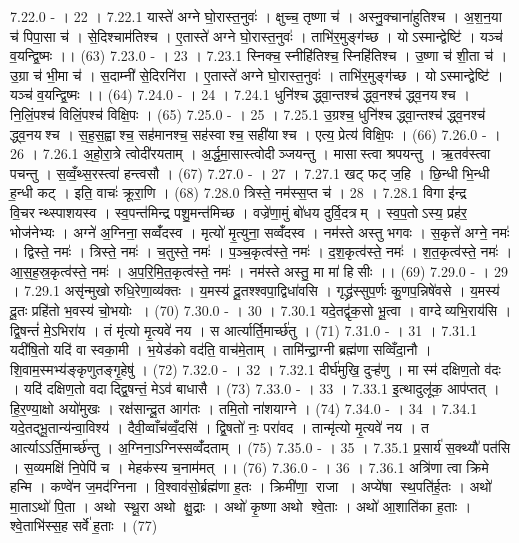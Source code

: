 7.22.0
- । 22 ।
7.22.1
यास्ते॑ अग्ने घो॒रास्त॒नुवः॑ । क्षुच्च॒ तृष्णा च॑ । अस्नु॒क्चाना॑हुतिश्च । अ॒श॒न॒या च॑ पिपा॒सा च॑ । से॒दिश्चाम॑तिश्च । ए॒तास्ते॑ अग्ने घो॒रास्त॒नुवः॑ । ताभि॑र॒मुङ्ग॑च्छ । योऽस्मान्द्वेष्टि॑ । यञ्च॑ व॒यन्द्वि॒ष्मः ।। (63)
7.23.0
- । 23 ।
7.23.1
स्निक्च॒ स्नीहि॑तिश्च॒ स्निहि॑तिश्च । उ॒ष्णा च॑ शी॒ता च॑ । उ॒ग्रा च॑ भी॒मा च॑ । स॒दाम्नी॑ से॒दिरनि॑रा । ए॒तास्ते॑ अग्ने घो॒रास्त॒नुवः॑ । ताभि॑र॒मुङ्ग॑च्छ । योऽस्मान्द्वेष्टि॑ । यञ्च॑ व॒यन्द्वि॒ष्मः ।। (64)
7.24.0
- । 24 ।
7.24.1
धुनि॑श्च द्ध्वा॒न्तश्च॑ द्ध्व॒नश्च॑ द्ध्व॒नय॑श्च । नि॒लिं॒पश्च॑ विलिं॒पश्च॑ विक्षि॒पः । (65)
7.25.0
- । 25 ।
7.25.1
उ॒ग्रश्च॒ धुनि॑श्च द्ध्वा॒न्तश्च॑ द्ध्व॒नश्च॑ द्ध्व॒नय॑श्च । स॒ह॒स॒ह्वाश्च॒ सह॑मानश्च॒ सह॑स्वाश्च॒ सही॑याश्च । एत्य॒ प्रेत्य॑ विक्षि॒पः । (66)
7.26.0
- । 26 ।
7.26.1
अ॒हो॒रा॒त्रे त्वोदी॑रयताम् । अ॒र्द्ध॒मा॒सास्त्वोदीञ्जयन्तु । मासास्त्वा श्रपयन्तु । ऋ॒तव॑स्त्वा पचन्तु । स॒व्वँ॒थ्स॒रस्त्वा॑ हन्त्वसौ । (67)
7.27.0
- । 27 ।
7.27.1
खट् फट् ज॒हि । छि॒न्धी भि॒न्धी ह॒न्धी कट् । इति॒ वाचः॑ क्रूरा॒णि । (68)
7.28.0
त्रिस्ते॒ नम॑स्स॒प्त च॑ । 28 ।
7.28.1
विगा इ॑न्द्र वि॒चरन्थ्स्पाशयस्व । स्व॒पन्त॑मिन्द्र पशु॒मन्त॑मिच्छ । वज्रे॑णा॒मुं बो॑धय दुर्वि॒दत्रम् । स्व॒प॒तोऽस्य॒ प्रह॑र॒ भोज॑नेभ्यः । अग्ने॑ अ॒ग्निना॒ सव्वँ॑दस्व । मृत्यो॑ मृ॒त्युना॒ सव्वँ॑दस्व । नम॑स्ते अस्तु भगवः । स॒कृत्ते॑ अग्ने॒ नमः॑ । द्विस्ते॒ नमः॑ । त्रिस्ते॒ नमः॑ । च॒तुस्ते॒ नमः॑ । प॒ञ्च॒कृत्व॑स्ते॒ नमः॑ । द॒श॒कृत्व॑स्ते॒ नमः॑ । श॒त॒कृत्व॑स्ते॒ नमः॑ । आ॒स॒ह॒स्र॒कृत्व॑स्ते॒ नमः॑ । अ॒प॒रि॒मि॒त॒कृत्व॑स्ते॒ नमः॑ । नम॑स्ते अस्तु॒ मा मा॑ हिसीः ।। (69)
7.29.0
- । 29 ।
7.29.1
असृ॑न्मुखो रुधि॒रेणा॒व्य॑क्तः । य॒मस्य॑ दू॒तश्श्वपा॒द्विधा॑वसि । गृद्ध्र॑स्सुप॒र्णः कु॒णप॒न्निषे॑वसे । य॒मस्य॑ दू॒तः प्रहि॑तो भ॒वस्य॑ चो॒भयोः । (70)
7.30.0
- । 30 ।
7.30.1
यदे॒तद्वृ॑क॒सो भू॒त्वा । वाग्देव्यभि॒राय॑सि । द्वि॒षन्तं॑ मे॒ऽभिरा॑य । तं मृ॑त्यो मृ॒त्यवे॑ नय । स आर्त्यार्ति॒मार्च्छ॑तु । (71)
7.31.0
- । 31 ।
7.31.1
यदी॑षि॒तो यदि॑ वा स्वका॒मी । भ॒येड॑को वद॑ति॒ वाच॑मे॒ताम् । तामि॑न्द्रा॒ग्नी ब्रह्म॑णा सव्विँदा॒नौ । शि॒वाम॒स्मभ्य॑ङ्कृणुतङ्गृ॒हेषु॑ । (72)
7.32.0
- । 32 ।
7.32.1
दीर्घ॑मुखि॒ दुऱ्ह॑णु । मा स्म॑ दक्षिण॒तो व॑दः । यदि॑ दक्षिण॒तो वदाद्द्वि॒षन्तं॒ मेऽव॑ बाधासै । (73)
7.33.0
- । 33 ।
7.33.1
इ॒त्थादुलू॑क॒ आप॑प्तत् । हि॒र॒ण्या॒क्षो अयो॑मुखः । रक्ष॑सान्दू॒त आग॑तः । तमि॒तो ना॑शयाग्ने । (74)
7.34.0
- । 34 ।
7.34.1
यदे॒तद्भू॒तान्य॑न्वा॒विश्य॑ । दैवी॒व्वाँच॑व्वँ॒दसि॑ । द्वि॒षतो॑ नः॒ परा॑वद । तान्मृ॑त्यो मृ॒त्यवे॑ नय । त आर्त्याऽऽर्ति॒मार्च्छ॑न्तु । अ॒ग्निना॒ऽग्निस्सव्वँ॑दताम् । (75)
7.35.0
- । 35 ।
7.35.1
प्र॒सार्य॑ स॒क्थ्यौ॑ पत॑सि । स॒व्यमक्षि॑ नि॒पेपि॑ च । मेहक॑स्य च॒नाम॑मत् ।। (76)
7.36.0
- । 36 ।
7.36.1
अत्रि॑णा त्वा क्रिमे हन्मि । कण्वे॑न ज॒मद॑ग्निना । वि॒श्वाव॑सो॒र्ब्रह्म॑णा ह॒तः । क्रिमी॑णा॒॒ राजा । अप्ये॑षा स्थ॒पति॑र्ह॒तः । अथो॑ मा॒ताऽथो॑ पि॒ता । अथो स्थू॒रा अथो क्षु॒द्राः । अथो॑ कृ॒ष्णा अथो श्वे॒ताः । अथो॑ आ॒शाति॑का ह॒ताः । श्वे॒ताभि॑स्स॒ह सर्वे॑ ह॒ताः । (77)
